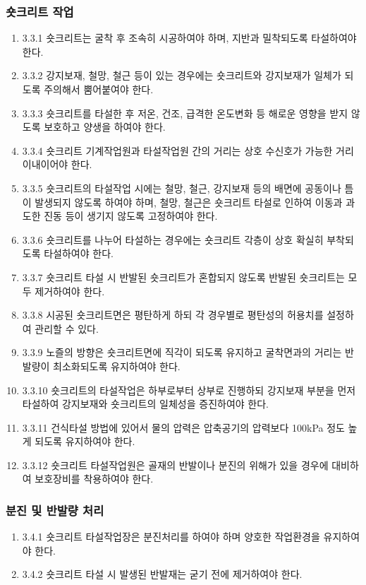 \documentclass[12pt,a4paper]{article}
\begin{document}
\subsubsection{숏크리트 작업}
\begin{enumerate}
\item  3.3.1 숏크리트는 굴착 후 조속히 시공하여야 하며, 지반과 밀착되도록 타설하여야 한다.   
\item  3.3.2 강지보재, 철망, 철근 등이 있는 경우에는 숏크리트와 강지보재가 일체가 되도록 주의해서 뿜어붙여야 한다.  
\item  3.3.3 숏크리트를 타설한 후 저온, 건조, 급격한 온도변화 등 해로운 영향을 받지 않도록 보호하고 양생을 하여야 한다.  
\item  3.3.4 숏크리트 기계작업원과 타설작업원 간의 거리는 상호 수신호가 가능한 거리 이내이어야 한다.  
\item  3.3.5 숏크리트의 타설작업 시에는 철망, 철근, 강지보재 등의 배면에 공동이나 틈이 발생되지 않도록 하여야 하며, 철망, 철근은 숏크리트 타설로 인하여 이동과 과도한 진동 등이 생기지 않도록 고정하여야 한다.  
\item  3.3.6 숏크리트를 나누어 타설하는 경우에는 숏크리트 각층이 상호 확실히 부착되도록 타설하여야 한다.  
\item  3.3.7 숏크리트 타설 시 반발된 숏크리트가 혼합되지 않도록 반발된 숏크리트는 모두 제거하여야 한다.  
\item  3.3.8 시공된 숏크리트면은 평탄하게 하되 각 경우별로 평탄성의 허용치를 설정하여 관리할 수 있다.  
\item  3.3.9 노즐의 방향은 숏크리트면에 직각이 되도록 유지하고 굴착면과의 거리는 반발량이 최소화되도록 유지하여야 한다.  
\item  3.3.10 숏크리트의 타설작업은 하부로부터 상부로 진행하되 강지보재 부분을 먼저 타설하여 강지보재와 숏크리트의 일체성을 증진하여야 한다.  
\item  3.3.11 건식타설 방법에 있어서 물의 압력은 압축공기의 압력보다 100kPa 정도 높게 되도록 유지하여야 한다.  
\item  3.3.12 숏크리트 타설작업원은 골재의 반발이나 분진의 위해가 있을 경우에 대비하여 보호장비를 착용하여야 한다.  
\end{enumerate}

\subsubsection{분진 및 반발량 처리}
\begin{enumerate}
\item  3.4.1 숏크리트 타설작업장은 분진처리를 하여야 하며 양호한 작업환경을 유지하여야 한다.   
\item  3.4.2 숏크리트 타설 시 발생된 반발재는 굳기 전에 제거하여야 한다.  
\end{enumerate}
\end{document}
